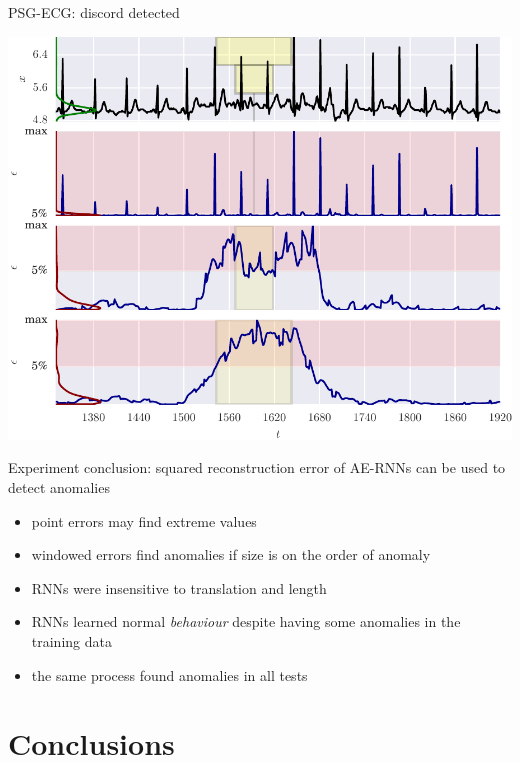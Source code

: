 \documentclass{beamer}
\begin{document}
    \begin{frame}{PSG-ECG: discord detected}

      \includegraphics[width=\textwidth]{figs/er_sleep.pdf}

    \end{frame}



    \begin{frame}{Experiment conclusion: squared reconstruction error of AE-RNNs can be used to detect anomalies}

      \begin{itemize}
        \item point errors may find extreme values
        \item windowed errors find anomalies if size is on the order of anomaly
        \item RNNs were insensitive to translation and length

        \item RNNs learned normal \emph{behaviour} despite having some anomalies in the training data

        \item the same process found anomalies in all tests
      \end{itemize}

    \end{frame}


    \section{Conclusions}
\end{document}
